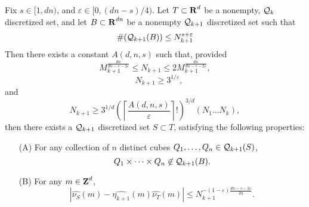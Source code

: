 \begin{lemma} \label{discreteFourierBuildingBlock}
    Fix $s \in [1,dn)$, and $\varepsilon \in [0,(dn-s)/4)$. Let $T \subset \operatorname{\mathbf{R}}^d$ be a nonempty, $\operatorname{\mathcal{Q}}_k$ discretized set, and let $B \subset \operatorname{\mathbf{R}}^{dn}$ be a nonempty $\operatorname{\mathcal{Q}}_{k+1}$ discretized set such that
    \begin{equation} \label{equation982589128942189}
    \begin{split}
        \#(\operatorname{\mathcal{Q}}_{k+1}(B)) \leq N_{k+1}^{s + \varepsilon}
    \end{split}
    \end{equation}
    Then there exists a constant $A(d,n,s)$ such that, provided
    \begin{equation} \label{equation5523786128439}
        M_{k+1}^{\frac{dn}{dn - s - 2\varepsilon}} \leq N_{k+1} \leq 2 M_{k+1}^{\frac{dn}{dn - s - 2\varepsilon}},
    \end{equation}
    \begin{equation} \label{equation189248914891}
        \quad N_{k+1} \geq 3^{1/\varepsilon},
    \end{equation}
    and
    \begin{equation} \label{equation77871247817841278}
        N_{k+1} \geq 3^{1/d} \left( \left\lceil \frac{A(d,n,s)}{\varepsilon} \right\rceil! \right)^{3/d} (N_1 \dots N_k),
    \end{equation}
    then there exists a $\operatorname{\mathcal{Q}}_{k+1}$ discretized set $S \subset T$, satisfying the following properties:
    \begin{enumerate}
        \item[(A)] For any collection of $n$ distinct cubes $Q_1, \dots, Q_n \in \operatorname{\mathcal{Q}}_{k+1}(S)$,
        \[ Q_1 \times \dots \times Q_n \not \in \operatorname{\mathcal{Q}}_{k+1}(B). \]

        \item[(B)] For any $m \in \operatorname{\mathbf{Z}}^d$,
        \[ |\widehat{\nu_S}(m) - \widehat{\eta_{k+1}}(m) \widehat{\nu_T}(m)| \leq N_{k+1}^{-(1 - \varepsilon) \frac{dn - s - 2\varepsilon}{2n}}. \]
    \end{enumerate}
\end{lemma}
